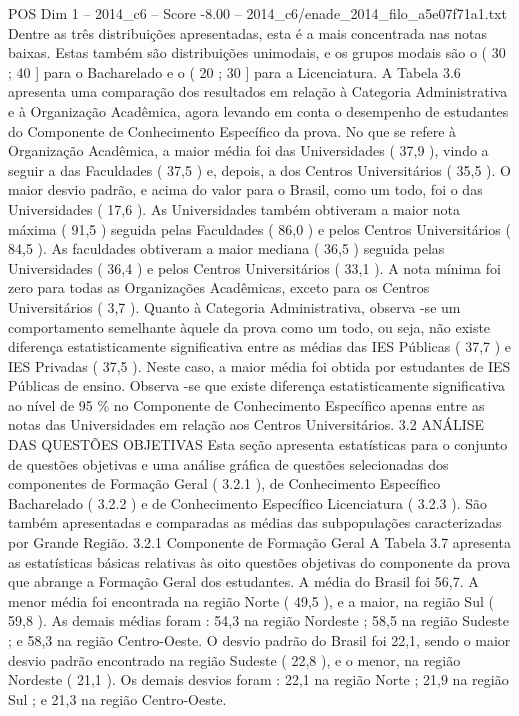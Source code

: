 \begin{textsample}{POS Dim 1 – 2014\_c6 – Score -8.00 – 2014\_c6/enade\_2014\_filo\_a5e07f71a1.txt}
Dentre as três distribuições apresentadas, esta é a mais concentrada nas notas baixas.
Estas também são distribuições unimodais, e os grupos modais são o ( 30 ; 40 ] para o Bacharelado e o ( 20 ; 30 ] para a Licenciatura.
A Tabela 3.6 apresenta uma comparação dos resultados em relação à Categoria Administrativa e à Organização Acadêmica, agora levando em conta o desempenho de estudantes do Componente de Conhecimento Específico da prova.
No que se refere à Organização Acadêmica, a maior média foi das Universidades ( 37,9 ), vindo a seguir a das Faculdades ( 37,5 ) e, depois, a dos Centros Universitários ( 35,5 ).
O maior desvio padrão, e acima do valor para o Brasil, como um todo, foi o das Universidades ( 17,6 ).
As Universidades também obtiveram a maior nota máxima ( 91,5 ) seguida pelas Faculdades ( 86,0 ) e pelos Centros Universitários ( 84,5 ).
As faculdades obtiveram a maior mediana ( 36,5 ) seguida pelas Universidades ( 36,4 ) e pelos Centros Universitários ( 33,1 ).
A nota mínima foi zero para todas as Organizações Acadêmicas, exceto para os Centros Universitários ( 3,7 ).
Quanto à Categoria Administrativa, observa -se um comportamento semelhante àquele da prova como um todo, ou seja, não existe diferença estatisticamente significativa entre as médias das IES Públicas ( 37,7 ) e IES Privadas ( 37,5 ).
Neste caso, a maior média foi obtida por estudantes de IES Públicas de ensino.
Observa -se que existe diferença estatisticamente significativa ao nível de 95 \% no Componente de Conhecimento Específico apenas entre as notas das Universidades em relação aos Centros Universitários. 3.2 ANÁLISE DAS QUESTÕES OBJETIVAS Esta seção apresenta estatísticas para o conjunto de questões objetivas e uma análise gráfica de questões selecionadas dos componentes de Formação Geral ( 3.2.1 ), de Conhecimento Específico Bacharelado ( 3.2.2 ) e de Conhecimento Específico Licenciatura ( 3.2.3 ).
São também apresentadas e comparadas as médias das subpopulações caracterizadas por Grande Região. 3.2.1 Componente de Formação Geral A Tabela 3.7 apresenta as estatísticas básicas relativas às oito questões objetivas do componente da prova que abrange a Formação Geral dos estudantes.
A média do Brasil foi 56,7.
A menor média foi encontrada na região Norte ( 49,5 ), e a maior, na região Sul ( 59,8 ).
As demais médias foram : 54,3 na região Nordeste ; 58,5 na região Sudeste ; e 58,3 na região Centro-Oeste.
O desvio padrão do Brasil foi 22,1, sendo o maior desvio padrão encontrado na região Sudeste ( 22,8 ), e o menor, na região Nordeste ( 21,1 ).
Os demais desvios foram : 22,1 na região Norte ; 21,9 na região Sul ; e 21,3 na região Centro-Oeste.

\end{textsample}
